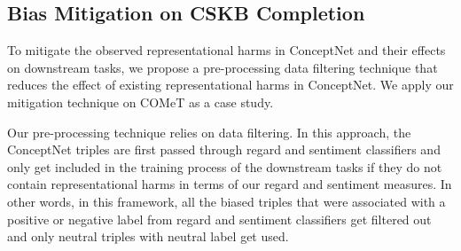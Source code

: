 \subsection{Bias Mitigation on CSKB Completion}
To mitigate the observed representational harms in ConceptNet and their effects on downstream tasks, we propose a pre-processing data filtering technique that reduces the effect of existing representational harms in ConceptNet. We apply our mitigation technique on COMeT as a case study. 

\begin{table}[t]
\centering
{}
\caption{Mitigation results of the filtering technique (COMeT-Filtered) compared to standard COMeT. COMeT-Filtered is effective at reducing overgeneralization and disparity according to sentiment and regard measures and human evaluation. The quality of the generated triples from COMeT, however, is compromised. 
}
\label{sentiment_table}
\end{table}
Our pre-processing technique relies on data filtering. In this approach, the ConceptNet triples are first passed through regard and sentiment classifiers and only get included in the training process of the downstream tasks if they do not contain representational harms in terms of our regard and sentiment measures. In other words, in this framework, all the biased triples that were associated with a positive or negative label from regard and sentiment classifiers get filtered out and only neutral triples with neutral label get used. 
